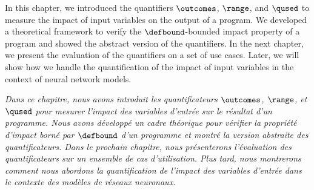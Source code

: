 In this chapter, we introduced the quantifiers $\outcomes$, $\range$, and $\qused$ to measure the impact of input variables on the output of a program.
We developed a theoretical framework to verify the $\defbound$-bounded impact property of a program and showed the abstract version of the quantifiers.
In the next chapter, we present the evaluation of the quantifiers on a set of use cases.
Later, we will show how we handle the quantification of the impact of input variables in the context of neural network models.


\frenchdiv

\emph{Dans ce chapitre, nous avons introduit les quantificateurs $\outcomes$, $\range$, et $\qused$ pour mesurer l'impact des variables d'entrée sur le résultat d'un programme. Nous avons développé un cadre théorique pour vérifier la propriété d'impact borné par $\defbound$ d'un programme et montré la version abstraite des quantificateurs. Dans le prochain chapitre, nous présenterons l'évaluation des quantificateurs sur un ensemble de cas d'utilisation. Plus tard, nous montrerons comment nous abordons la quantification de l'impact des variables d'entrée dans le contexte des modèles de réseaux neuronaux.}
